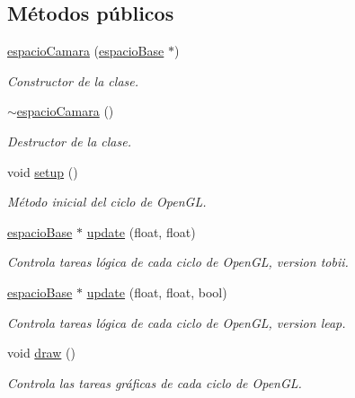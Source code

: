 \subsection*{Métodos públicos}
\begin{DoxyCompactItemize}
\item 
\hyperlink{classespacio_camara_adf85b2cd673cb9eafee260e14b9c9f41}{espacio\+Camara} (\hyperlink{classespacio_base}{espacio\+Base} $\ast$)
\begin{DoxyCompactList}\small\item\em Constructor de la clase. \end{DoxyCompactList}\item 
\hyperlink{classespacio_camara_aa6ac19fb18722f62697bfe43b1b171ce}{$\sim$espacio\+Camara} ()
\begin{DoxyCompactList}\small\item\em Destructor de la clase. \end{DoxyCompactList}\item 
void \hyperlink{classespacio_camara_af9b840498c705d9fe3ca8e363b4a535b}{setup} ()
\begin{DoxyCompactList}\small\item\em Método inicial del ciclo de Open\+G\+L. \end{DoxyCompactList}\item 
\hyperlink{classespacio_base}{espacio\+Base} $\ast$ \hyperlink{classespacio_camara_a117e74caaada721c6501680811f9f867}{update} (float, float)
\begin{DoxyCompactList}\small\item\em Controla tareas lógica de cada ciclo de Open\+G\+L, version tobii. \end{DoxyCompactList}\item 
\hyperlink{classespacio_base}{espacio\+Base} $\ast$ \hyperlink{classespacio_camara_ac1105bfb11c421b4675cdde7c82255c3}{update} (float, float, bool)
\begin{DoxyCompactList}\small\item\em Controla tareas lógica de cada ciclo de Open\+G\+L, version leap. \end{DoxyCompactList}\item 
void \hyperlink{classespacio_camara_a2c3d027a3787a226e00aab10c93f1bbe}{draw} ()
\begin{DoxyCompactList}\small\item\em Controla las tareas gráficas de cada ciclo de Open\+G\+L. \end{DoxyCompactList}\end{DoxyCompactItemize}
